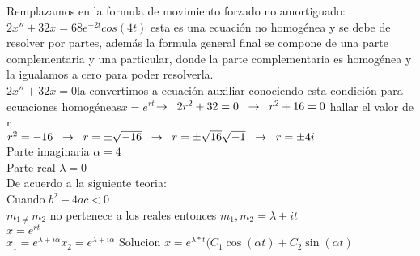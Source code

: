 \documentclass[12pt,a4paper]{article}
\begin{document}
Remplazamos en la formula de movimiento forzado no amortiguado:
\hspace{0.2cm}$2x''+32x=68e^{-2t}cos (4t)$\hspace{0.2cm} esta es una ecuación no homogénea y se debe de resolver por partes, además la formula general final se compone de una parte complementaria y una particular, donde la parte complementaria es homogénea y la igualamos a cero para poder resolverla. \\

$2x''+32x=0$\hspace{0.2cm}la convertimos a  ecuación auxiliar conociendo esta condición para ecuaciones homogéneas\hspace{0.2cm}$x=e^{rt}$\hspace{0.2cm}$\rightarrow\hspace{0.2cm}2r^2+32=0 \hspace{0.2cm}\rightarrow\hspace{0.2cm} r^2+16=0$ hallar el valor de r \\

$r^2=-16\hspace{0.2cm}\rightarrow\hspace{0.2cm}r=\pm\sqrt{-16}\hspace{0.2cm}\rightarrow\hspace{0.2cm}r=\pm\sqrt{16}\sqrt{-1}\hspace{0.2cm}\rightarrow\hspace{0.2cm}r=\pm 4i$\\

Parte imaginaria $\alpha=4$\\

Parte real $\lambda=0$\\

De acuerdo a la siguiente teoria:\\

Cuando $b^2-4ac<0$\\

$m_{1\neq }m_{2}$ no pertenece a los reales entonces $m_{1 },m_{2}=\lambda \pm it$\\

$x=e^{rt}$\\

$x_{1}=e^{\lambda+i\alpha}$\hspace{2cm}$x_{2}=e^{\lambda+i\alpha }$\hspace{2cm} Solucion  $x=e^{\lambda*t }(C_{1}\cos(\alpha t)+C_{2}\sin(\alpha t)$\\
\end{document}
